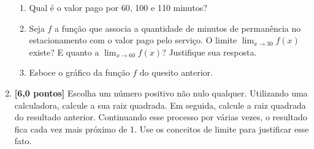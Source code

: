 \documentclass[12pt,a4paper]{article}
\begin{document}
\begin{enumerate}
    \begin{enumerate}
      \item Qual é o valor pago por 60, 100 e 110 minutos?
      \item Seja $f$ a função que associa a quantidade de minutos de permanência
        no estacionamento com o valor pago pelo serviço. O limite ${\displaystyle \lim_{x\to 30} f(x)}$
        existe? E quanto a ${\displaystyle \lim_{x\to 60}f(x)}$? Justifique sua resposta.
      \item Esboce o gráfico da função $f$ do quesito anterior.
    \end{enumerate}

 
  \item \textbf{[6,0 pontos]} Escolha um número positivo não nulo qualquer. 
   Utilizando uma calculadora, calcule a sua raiz quadrada. Em seguida, calcule 
   a raiz quadrada do resultado anterior. Continuando esse processo por várias vezes, 
   o resultado fica cada vez mais próximo de 1. Use os conceitos de limite para justificar esse fato.

  \end{enumerate}
\end{document}
